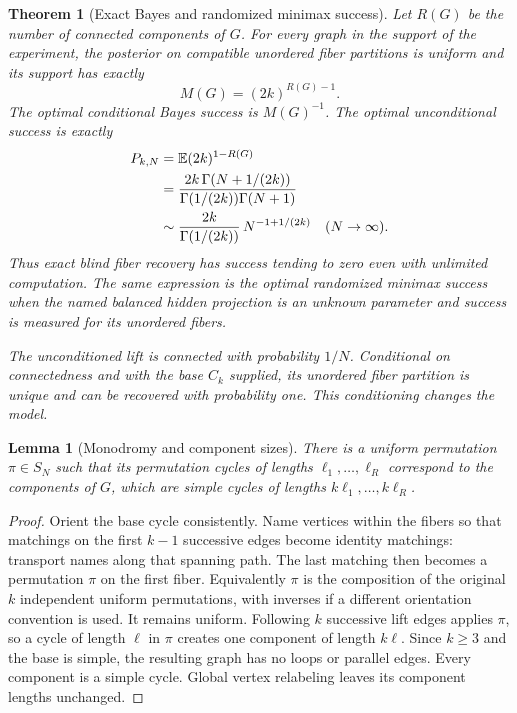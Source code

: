 \documentclass[11pt]{article}
\newtheorem{theorem}{Theorem}
\newtheorem{lemma}{Lemma}
\newcommand{\E}{\mathbb E}
\begin{document}
\begin{theorem}[Exact Bayes and randomized minimax success]
Let $R(G)$ be the number of connected components of $G$. For every graph
in the support of the experiment, the posterior on compatible unordered
fiber partitions is uniform and its support has exactly
\begin{equation}
 M(G)=(2k)^{R(G)-1}.                                      \label{number}
\end{equation}
The optimal conditional Bayes success is $M(G)^{-1}$. The optimal
unconditional success is exactly
\begin{align}
 P_{k,N}
 &=\E(2k)^{1-R(G)}                                      \notag\\
 &=\frac{2k\,\Gamma(N+1/(2k))}
         {\Gamma(1/(2k))\Gamma(N+1)}                    \label{exact}\\
 &\sim\frac{2k}{\Gamma(1/(2k))}\,
                   N^{-1+1/(2k)}\quad(N\to\infty).      \notag
\end{align}
Thus exact blind fiber recovery has success tending to zero even with
unlimited computation. The same expression is the optimal randomized
minimax success when the named balanced hidden projection is an unknown
parameter and success is measured for its unordered fibers.

The unconditioned lift is connected with probability $1/N$. Conditional
on connectedness and with the base $C_k$ supplied, its unordered fiber
partition is unique and can be recovered with probability one. This
conditioning changes the model.
\end{theorem}

\begin{lemma}[Monodromy and component sizes]
There is a uniform permutation $\pi\in S_N$ such that its permutation
cycles of lengths $\ell_1,\ldots,\ell_R$ correspond to the components
of $G$, which are simple cycles of lengths $k\ell_1,\ldots,k\ell_R$.
\end{lemma}
\begin{proof}
Orient the base cycle consistently. Name vertices within the fibers so
that matchings on the first $k-1$ successive edges become identity
matchings: transport names along that spanning path. The last matching
then becomes a permutation $\pi$ on the first fiber. Equivalently $\pi$
is the composition of the original $k$ independent uniform permutations,
with inverses if a different orientation convention is used. It remains
uniform. Following $k$ successive lift edges applies $\pi$, so a cycle
of length $\ell$ in $\pi$ creates one component of length $k\ell$.
Since $k\geq3$ and the base is simple, the resulting graph has no loops
or parallel edges. Every component is a simple cycle. Global vertex
relabeling leaves its component lengths unchanged.
\end{proof}
\end{document}
